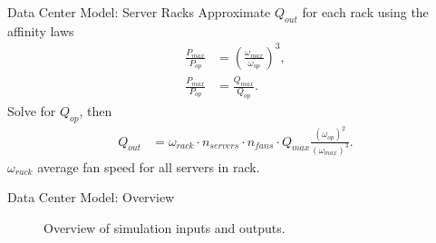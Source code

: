 \documentclass{beamer}
\begin{document}
\begin{frame}{Data Center Model: Server Racks}
Approximate $Q_{out}$ for each rack using the affinity laws
\begin{align}
\frac{P_{max}}{P_{op}} &= \left( \frac{\omega_{max}}{\omega_{op}} \right)^3,\\
\frac{P_{max}}{P_{op}} &= \frac{Q_{max}}{Q_{op}}.
\end{align}
Solve for $Q_{op}$, then
\begin{align}
Q_{out} &= \omega_{rack} \cdot n_{servers}  \cdot n_{fans} \cdot Q_{max}\frac{(\omega_{op})^2}{(\omega_{max})^3}.
\end{align}
$ \omega_{rack}$ average fan speed for all servers in rack.
\begin{table}[h]
\begin{center}\scriptsize
{}
\end{center}
\end{table}

\end{frame}

\begin{frame}{Data Center Model: Overview}
\begin{figure}[!htb]
\centering
\begin{tiny} %
\def\svgwidth{1.0\linewidth}

\end{tiny}
\caption{Overview of simulation inputs and outputs.}
\end{figure}
\end{frame}
\end{document}
